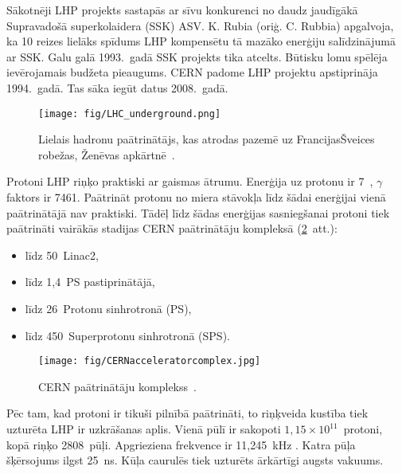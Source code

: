 Sākotnēji LHP projekts sastapās ar sīvu konkurenci no daudz jaudīgākā Supravadošā superkolaidera (SSK) ASV. K. Rubia (oriģ. C. Rubbia) apgalvoja, ka 10 reizes lielāks spīdums LHP kompensētu tā mazāko enerģiju salīdzinājumā ar SSK. Galu galā 1993.~gadā SSK projekts tika atcelts. Būtisku lomu spēlēja ievērojamais budžeta pieaugums. CERN padome LHP projektu apstiprināja 1994.~gadā. Tas sāka iegūt datus 2008.~gadā.

\begin{figure}[htpb]
  \centering
  \texttt{[image: fig/LHC\_underground.png]}
  \caption{Lielais hadronu paātrinātājs, kas atrodas pazemē uz Francijas\textendash Šveices robežas, Ženēvas apkārtnē~\cite{cds:LHCunderground}.}
  \label{fig:LHC_underground}
\end{figure}

Protoni LHP riņķo praktiski ar gaismas ātrumu. Enerģija uz protonu ir 7~\TeV, $\gamma$ faktors ir 7461. Paātrināt protonu no miera stāvokļa līdz šādai enerģijai vienā paātrinātājā nav praktiski. Tādēļ līdz šādas enerģijas sasniegšanai protoni tiek paātrināti vairākās stadijas CERN paātrinātāju kompleksā (\ref{fig:CERN_accelerator_complex}~att.):

\begin{itemize}
\item līdz 50~\MeV Linac2,
\item līdz 1,4~\GeV PS \gls{pastiprinātājā},
\item līdz 26~\GeV Protonu sinhrotronā (PS),
\item līdz 450~\GeV Superprotonu sinhrotronā (SPS).
\end{itemize}

\begin{figure}[htpb]
  \centering
  \texttt{[image: fig/CERNacceleratorcomplex.jpg]}
  \caption{CERN paātrinātāju komplekss~\cite{espace:CERNacceleratorcomplex}.}
  \label{fig:CERN_accelerator_complex}
\end{figure}

Pēc tam, kad protoni ir tikuši pilnībā paātrināti, to riņķveida kustība tiek uzturēta \textendash LHP ir \gls{uzkrāšanas aplis}. Vienā \gls{pūlī} ir sakopoti $1,15\times10^{11}$~protoni, kopā riņķo 2808~pūļi. Apgrieziena frekvence ir 11,245~kHz \cite{Bruning:2004ej}. Katra pūļa šķērsojums ilgst 25~ns. Kūļa caurulēs tiek uzturēts ārkārtīgi augsts vakuums.

